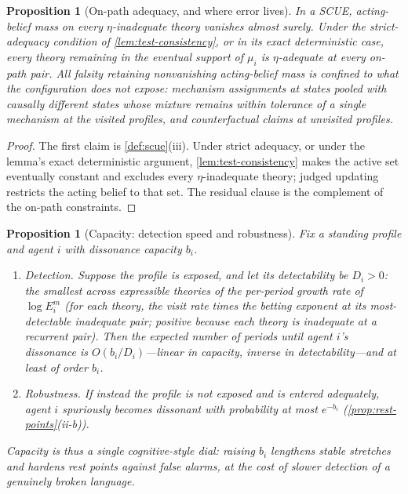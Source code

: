 \documentclass[11pt]{article}
\newtheorem{proposition}[assumption]{Proposition}
\theoremstyle{definition}
\begin{document}
\begin{proposition}[On-path adequacy, and where error lives]
\label{prop:adequacy}
In a SCUE, acting-belief mass on every $\eta$-inadequate theory vanishes almost surely.
Under the strict-adequacy condition of \cref{lem:test-consistency}, or in its exact deterministic case, every theory remaining in the eventual support of $\mu_i$ is $\eta$-adequate at every on-path pair.
All falsity retaining nonvanishing acting-belief mass is confined to what the configuration does not expose: mechanism assignments at states pooled with causally different states whose mixture remains within tolerance of a single mechanism at the visited profiles, and counterfactual claims at unvisited profiles.
\end{proposition}

\begin{proof}
The first claim is \cref{def:scue}(iii).
Under strict adequacy, or under the lemma's exact deterministic argument, \cref{lem:test-consistency} makes the active set eventually constant and excludes every $\eta$-inadequate theory; judged updating restricts the acting belief to that set.
The residual clause is the complement of the on-path constraints.
\end{proof}

\begin{proposition}[Capacity: detection speed and robustness]
\label{prop:capacity}
Fix a standing profile and agent $i$ with dissonance capacity $b_i$.
\begin{enumerate}[label=(\roman*)]
  \item \emph{Detection.} Suppose the profile is exposed, and let its \emph{detectability} be $D_i>0$: the smallest across expressible theories of the per-period growth rate of $\log E_i^{m}$ (for each theory, the visit rate times the betting exponent at its most-detectable inadequate pair; positive because each theory is inadequate at a recurrent pair). Then the expected number of periods until agent $i$'s dissonance is $O(b_i/D_i)$---linear in capacity, inverse in detectability---and at least of order $b_i$.
  \item \emph{Robustness.} If instead the profile is not exposed and is entered adequately, agent $i$ spuriously becomes dissonant with probability at most $e^{-b_i}$ (\cref{prop:rest-points}(ii-b)).
\end{enumerate}
Capacity is thus a single cognitive-style dial: raising $b_i$ lengthens stable stretches and hardens rest points against false alarms, at the cost of slower detection of a genuinely broken language.
\end{proposition}
\end{document}

